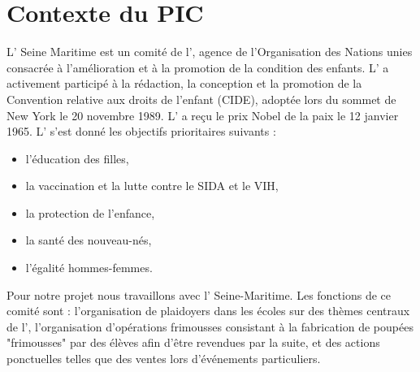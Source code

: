 \documentclass[asi]{picInsa}
\title{\PQ{}}
\author{\Pierre}
\begin{document}
\couverture{}

\informationsGenerales{}
%



\section{Contexte du PIC}
L'\nomClient{} Seine Maritime est un comité de l'\nomClient{},  agence de l'Organisation des Nations unies consacrée à l'amélioration et à la promotion de la condition des enfants.  L'\nomClient{} a activement participé à la rédaction, la conception et la promotion de la Convention relative aux droits de l'enfant (CIDE), adoptée lors du sommet de New York le 20 novembre 1989. L'\nomClient{} a reçu le prix Nobel de la paix le 12 janvier 1965. L'\nomClient{} s'est donné les objectifs prioritaires suivants :
\begin{itemize}
	\item l'éducation des filles,
	\item la vaccination et la lutte contre le SIDA et le VIH,
	\item la protection de l'enfance,
	\item la santé des nouveau-nés,
	\item l'égalité hommes-femmes\vspace{0.5cm}.
\end{itemize}

Pour notre projet nous travaillons avec l'\nomClient{} Seine-Maritime. Les fonctions de ce comité sont : l'organisation de plaidoyers dans les écoles sur des thèmes centraux de l'\nomClient, l'organisation d'opérations frimousses consistant à la fabrication de poupées "frimousses" par des élèves afin d'être revendues par la suite, et des actions ponctuelles telles que des ventes lors d’événements particuliers.
\end{document}
